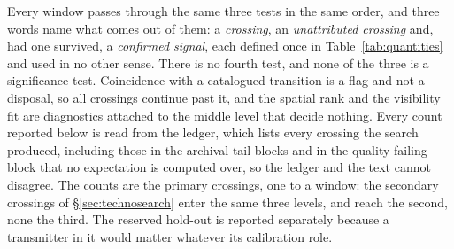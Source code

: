 Every window passes through the same three tests in the same order, and
three words name what comes out of them: a \emph{crossing}, an
\emph{unattributed crossing} and, had one survived, a \emph{confirmed
signal}, each defined once in Table~\ref{tab:quantities} and used in no other
sense. There is no fourth test, and none of the three is a significance
test. Coincidence with a catalogued transition is a flag and not a disposal, so
all \CnCross{} crossings continue past it, and the spatial rank and the
visibility fit are diagnostics attached to the middle level that decide
nothing. Every count reported below is read from the ledger, which lists every
crossing the search produced, including those in the archival-tail blocks and
in the quality-failing block that no expectation is computed over, so the
ledger and the text cannot disagree. The counts are the primary crossings, one
to a window: the \CkNSecondary{} secondary crossings of
\S\ref{sec:technosearch} enter the same three levels, and
\CkNSecUnattrWord{} reach the second, none the third. The reserved hold-out is
reported separately because a transmitter in it would matter whatever its
calibration role.

